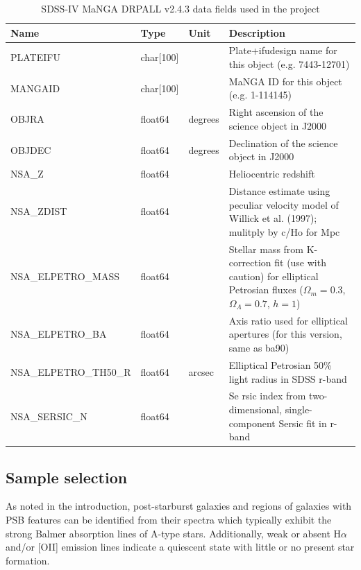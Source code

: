 \begin{table}
\caption[MaNGA DRPALL fields used in the project]{SDSS-IV MaNGA DRPALL v2.4.3 data fields used in the project}
\label{tab:DRPall-table}
\begin{tabular}{|p{3.2cm}|p{1.2cm}||p{1cm}|p{9.8cm}|}
\hline
Name & Type & Unit & Description \\
\hline
PLATEIFU & char{[}100{]} &  & Plate+ifudesign name for this object (e.g. 7443-12701)\\
MANGAID & char{[}100{]} & & MaNGA ID for this object (e.g. 1-114145)\\
OBJRA & float64 & degrees & Right ascension of the science object in J2000\\
OBJDEC & float64 & degrees & Declination of the science object in J2000\\
NSA\_Z & float64 &  & Heliocentric redshift\\
NSA\_ZDIST & float64 &  & Distance estimate using peculiar velocity model of Willick et al. (1997); mulitply by c/Ho for Mpc\\
NSA\_ELPETRO\_MASS & float64 &  & Stellar mass from K-correction fit (use with caution) for elliptical Petrosian fluxes ($\Omega_m=0.3$, $\Omega_\Lambda=0.7$, $h=1$)\\
NSA\_ELPETRO\_BA & float64 &  & Axis ratio used for elliptical apertures (for this version, same as ba90)\\
NSA\_ELPETRO\_TH50\_R & float64 & arcsec & Elliptical Petrosian 50\% light radius in SDSS r-band\\
NSA\_SERSIC\_N & float64 &  & Se
rsic index from two-dimensional, single-component Sersic fit in r-band\\
\hline
\end{tabular}
\end{table}

\subsection{Sample selection}
As noted in the introduction, post-starburst galaxies and regions of galaxies with PSB features can be identified from their spectra which typically exhibit the strong Balmer absorption lines of A-type stars. Additionally, weak or absent H$\alpha$ and/or [OII] emission lines indicate a quiescent state with little or no present star formation. 

